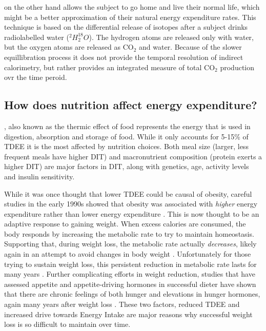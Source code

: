 \documentclass{tufte-handout}
\begin{document}
 on the other hand allows the subject to go home and live their normal life, which might be a better approximation of their natural energy expenditure rates.  This technique is based on the differential release of isotopes after a subject drinks radiolabelled water ($^2H_2^{18}O$).  The hydrogen atoms are released only with water, but the oxygen atoms are released as CO$_2$ and water.  Because of the slower equillibration process it does not provide the temporal resolution of indirect calorimetry, but rather provides an integrated measure of total CO$_2$ production ovr the time peroid.

\subsection{How does nutrition affect energy expenditure?} 

, also known as the thermic effect of food represents the energy that is used in digestion, absorption and storage of food.  While it only accounts for 5-15\% of TDEE it is the most affected by nutrition choices.  Both meal size (larger, less frequent meals have higher DIT) and macronutrient composition (protein exerts a higher DIT) are major factors in DIT, along with genetics, age, activity levels and insulin sensitivity.  

While it was once thought that lower TDEE could be causal of obesity, careful studies in the early 1990s showed that obesity was associated with \emph{higher} energy expenditure rather than lower energy expenditure \citep{Ravussin1982}.  This is now thought to be an adaptive response to gaining weight.  When excess calories are consumed, the body responds by increasing the metabolic rate to try to maintain homeostasis.  Supporting that, during weight loss, the metabolic rate actually \emph{decreases}, likely again in an attempt to avoid changes in body weight \citep{Leibel1995a}.  Unfortunately for those trying to sustain weight loss, this persistent reduction in metabolic rate lasts for many years \citep{Rosenbaum2008}.  Further complicating efforts in weight reduction, studies that have assessed appetite and appetite-driving hormones in successful dieter have shown that there are chronic feelings of both hunger and elevations in hunger hormones, again many years after weight loss \citep{Sumithran2011}.  These two factors, reduced TDEE and increased drive towards Energy Intake are major reasons why successful weight loss is so difficult to maintain over time.




\end{document}

